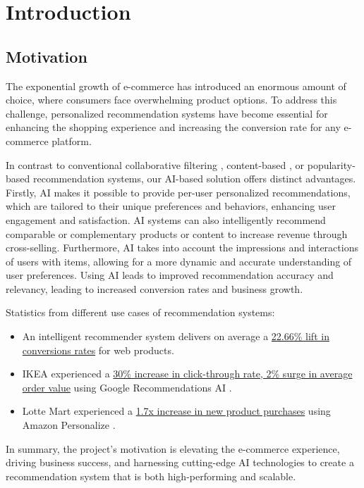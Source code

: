 \chapter{Introduction}
\minitoc

\section{Motivation}

The exponential growth of e-commerce has introduced an enormous amount of choice, where consumers face overwhelming product options. To address this challenge, personalized recommendation systems \cite{raghavendra2018personalized} have become essential for enhancing the shopping experience and increasing the conversion rate for any e-commerce platform.

In contrast to conventional collaborative filtering \cite{NvidiaRecSys}, content-based \cite{pazzani2007content}, or popularity-based recommendation systems, our AI-based solution offers distinct advantages. Firstly, AI makes it possible to provide per-user personalized recommendations, which are tailored to their unique preferences and behaviors, enhancing user engagement and satisfaction. AI systems can also intelligently recommend comparable or complementary products or content to increase revenue through cross-selling. Furthermore, AI takes into account the impressions and interactions of users with items, allowing for a more dynamic and accurate understanding of user preferences. Using AI leads to improved recommendation accuracy and relevancy, leading to increased conversion rates and business growth.
    




Statistics from different use cases of recommendation systems:
\begin{itemize}[left=0in]
    \item An intelligent recommender system delivers on average a
    \underline{22.66\% lift in conversions rates} \cite{salesforce2014predictive} for web products.
    
    \item IKEA experienced a \underline{30\% increase in click-through rate, 2\% surge in average order value} \cite{IkeaRecAtGoogleCloudSummit} using Google Recommendations AI \cite{GoogleRecommendationsAI}.
    
    \item Lotte Mart experienced a
    \underline{1.7x increase in new product purchases}  \cite{LotteMartAwsPersonalize} using Amazon Personalize \cite{AWSPersonalize}.
\end{itemize}
In summary, the project's motivation is elevating the e-commerce experience, driving business success, and harnessing cutting-edge AI technologies to create a recommendation system that is both high-performing and scalable.

